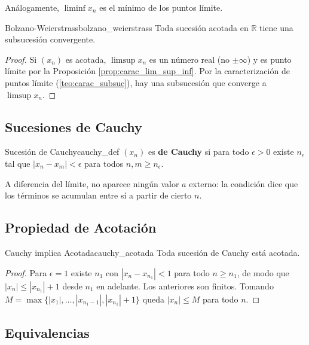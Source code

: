 \documentclass[11pt, a4paper]{article}
\begin{document}
Análogamente, $\liminf x_n$ es el mínimo de los puntos límite.

\begin{teorema}{Bolzano-Weierstrass}{bolzano_weierstrass}
Toda sucesión acotada en $\mathbb{R}$ tiene una subsucesión convergente.
\end{teorema}

\begin{proof}
Si $(x_n)$ es acotada, $\limsup x_n$ es un número real (no $\pm\infty$) y es punto límite por la
Proposición \ref{prop:carac_lim_sup_inf}. Por la caracterización de puntos límite
(\ref{teo:carac_subsuc}), hay una subsucesión que
converge a $\limsup x_n$.
\end{proof}

\subsection{Sucesiones de Cauchy}

\begin{definicion}{Sucesión de Cauchy}{cauchy_def}
$(x_n)$ es \textbf{de Cauchy} si para todo $\epsilon > 0$ existe $n_\epsilon$ tal que
$|x_n - x_m| < \epsilon$ para todos $n, m \ge n_\epsilon$.
\end{definicion}

\obs A diferencia del límite, no aparece ningún valor $a$ externo: la condición dice que los
términos se acumulan entre sí a partir de cierto $n$.

\subsection{Propiedad de Acotación}

\begin{teorema}{Cauchy implica Acotada}{cauchy_acotada}
Toda sucesión de Cauchy está acotada.
\end{teorema}

\begin{proof}
Para $\epsilon = 1$ existe $n_1$ con $|x_n - x_{n_1}| < 1$ para todo $n \ge n_1$, de modo que
$|x_n| \le |x_{n_1}| + 1$ desde $n_1$ en adelante. Los anteriores son finitos. Tomando
$M = \max\{|x_1|, \dots, |x_{n_1-1}|, |x_{n_1}|+1\}$ queda $|x_n| \le M$ para todo $n$.
\end{proof}

\subsection{Equivalencias}
\end{document}
